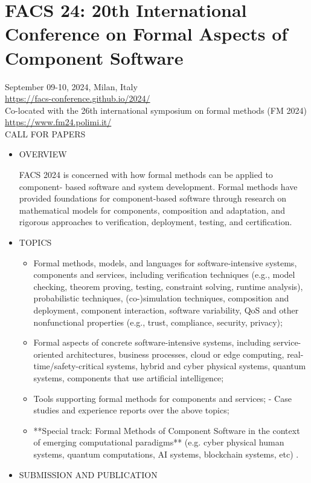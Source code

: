 \documentclass[prodmode,acmtecs]{acmsmall} %
\begin{document}
\section{FACS 24: 20th International Conference on Formal Aspects of Component Software}\label{FACS24}  September 09-10, 2024, Milan, Italy\\ 
  \href{https://facs-conference.github.io/2024/}{https://facs-conference.github.io/2024/}\\ 
  Co-located with the 26th international symposium on formal methods (FM 2024) \href{https://www.fm24.polimi.it/}{https://www.fm24.polimi.it/}\\ 
CALL FOR PAPERS 

\begin{itemize}\item  OVERVIEW 
 
  FACS 2024 is concerned with how formal methods can be applied to component- based software and system development. Formal methods have provided foundations for component-based software through research on mathematical models for components, composition and adaptation, and rigorous approaches to verification, deployment, testing, and certification. 
 
\item  TOPICS 
 
\begin{itemize}\item  Formal methods, models, and languages for software-intensive systems, components and services, including verification techniques (e.g., model checking, theorem proving, testing, constraint solving, runtime analysis), probabilistic techniques, (co-)simulation techniques, composition and deployment, component interaction, software variability, QoS and other nonfunctional properties (e.g., trust, compliance, security, privacy);
\item  Formal aspects of concrete software-intensive systems, including service- oriented architectures, business processes, cloud or edge computing, real- time/safety-critical systems, hybrid and cyber physical systems, quantum systems, components that use artificial intelligence;
\item  Tools supporting formal methods for components and services; - Case studies and experience reports over the above topics;
\item  **Special track: Formal Methods of Component Software in the context of emerging computational paradigms** (e.g. cyber physical human systems, quantum computations, AI systems, blockchain systems, etc) .
\end{itemize} 
\item  SUBMISSION AND PUBLICATION 
 

\end{itemize}
\end{document}
